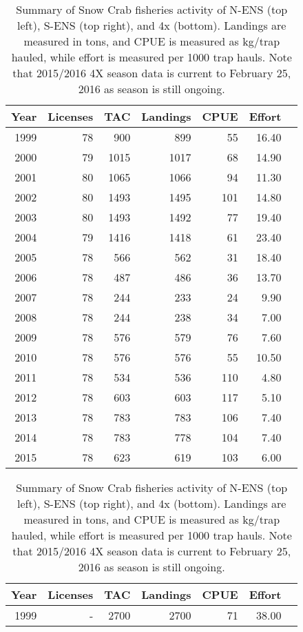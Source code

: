 \documentclass[paper=a4, fontsize=11pt]{article}
\begin{document}
\begin{table}[h]
\caption{ Summary of Snow Crab fisheries activity of N-ENS (top left), S-ENS (top right), and 4x (bottom). Landings are measured in tons, and CPUE is measured as kg/trap hauled, while effort is measured per 1000 trap hauls. Note that 2015/2016 4X season data is current to February 25, 2016 as season is still ongoing.}
\begin{tabular}{rrrrrrr}
  \hline
 Year & Licenses & TAC & Landings & CPUE & Effort \\ 
  \hline
1999 &  78 & 900 & 899 &  55 & 16.40 \\ 
2000 &  79 & 1015 & 1017 &  68 & 14.90 \\ 
2001 &  80 & 1065 & 1066 &  94 & 11.30 \\ 
2002 &  80 & 1493 & 1495 & 101 & 14.80 \\ 
2003 &  80 & 1493 & 1492 &  77 & 19.40 \\ 
2004 &  79 & 1416 & 1418 &  61 & 23.40 \\ 
2005 &  78 & 566 & 562 &  31 & 18.40 \\ 
2006 &  78 & 487 & 486 &  36 & 13.70 \\ 
2007 &  78 & 244 & 233 &  24 & 9.90 \\ 
2008 &  78 & 244 & 238 &  34 & 7.00 \\ 
2009 &  78 & 576 & 579 &  76 & 7.60 \\ 
2010 &  78 & 576 & 576 &  55 & 10.50 \\ 
2011 &  78 & 534 & 536 & 110 & 4.80 \\ 
2012 &  78 & 603 & 603 & 117 & 5.10 \\ 
2013 &  78 & 783 & 783 & 106 & 7.40 \\ 
2014 &  78 & 783 & 778 & 104 & 7.40 \\ 
2015 &  78 & 623 & 619 &  103 & 6.00 \\ 
   \hline
\end{tabular}
\qquad
\begin{tabular}{rrrrrrr}
  \hline
Year & Licenses & TAC & Landings & CPUE & Effort \\ 
  \hline
1999 & - & 2700 & 2700 &  71 & 38.00 \\ 

\end{tabular}
\end{table}
\end{document}
